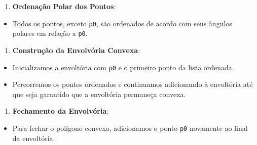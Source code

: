 \documentclass[11pt]{article}
\providecommand{\tightlist}{%
      \setlength{\itemsep}{0pt}\setlength{\parskip}{0pt}}
\begin{document}
\begin{enumerate}
\def\labelenumi{\arabic{enumi}.}
\setcounter{enumi}{2}
\tightlist
\item
  \textbf{Ordenação Polar dos Pontos}:
\end{enumerate}

\begin{itemize}
\tightlist
\item
  Todos os pontos, exceto \texttt{p0}, são ordenados de acordo com seus
  ângulos polares em relação a \texttt{p0}.
\end{itemize}

\begin{enumerate}
\def\labelenumi{\arabic{enumi}.}
\setcounter{enumi}{3}
\tightlist
\item
  \textbf{Construção da Envolvória Convexa}:
\end{enumerate}

\begin{itemize}
\tightlist
\item
  Inicializamos a envoltória com \texttt{p0} e o primeiro ponto da lista
  ordenada.
\item
  Percorremos os pontos ordenados e continuamos adicionando à envoltória
  até que seja garantido que a envoltória permaneça convexa.
\end{itemize}

\begin{enumerate}
\def\labelenumi{\arabic{enumi}.}
\setcounter{enumi}{4}
\tightlist
\item
  \textbf{Fechamento da Envolvória}:
\end{enumerate}

\begin{itemize}
\tightlist
\item
  Para fechar o polígono convexo, adicionamos o ponto \texttt{p0}
  novamente ao final da envoltória.
\end{itemize}
\end{document}
